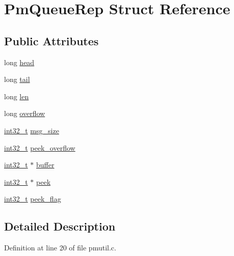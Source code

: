 \hypertarget{struct_pm_queue_rep}{}\section{Pm\+Queue\+Rep Struct Reference}
\label{struct_pm_queue_rep}
\subsection*{Public Attributes}
\begin{DoxyCompactItemize}
\item 
long \hyperlink{struct_pm_queue_rep_ab516ccc6cedbf2ab076e63ad122c10a5}{head}
\item 
long \hyperlink{struct_pm_queue_rep_a86aa2ed3eb0f43260058824bd92c5993}{tail}
\item 
long \hyperlink{struct_pm_queue_rep_a6e3749a77433a84bb26f7d89521adc5c}{len}
\item 
long \hyperlink{struct_pm_queue_rep_a5fcbe9d90e738fb69b03ba7f2b847581}{overflow}
\item 
\hyperlink{lib-src_2ffmpeg_2win32_2stdint_8h_a37994e3b11c72957c6f454c6ec96d43d}{int32\+\_\+t} \hyperlink{struct_pm_queue_rep_a87c1527e7fa395a0aae18efe6f9cd79a}{msg\+\_\+size}
\item 
\hyperlink{lib-src_2ffmpeg_2win32_2stdint_8h_a37994e3b11c72957c6f454c6ec96d43d}{int32\+\_\+t} \hyperlink{struct_pm_queue_rep_ab5aa2fd81ec89f4674a87485398ab0dd}{peek\+\_\+overflow}
\item 
\hyperlink{lib-src_2ffmpeg_2win32_2stdint_8h_a37994e3b11c72957c6f454c6ec96d43d}{int32\+\_\+t} $\ast$ \hyperlink{struct_pm_queue_rep_a808f75fb14f8aef3ceadc691bbd0986b}{buffer}
\item 
\hyperlink{lib-src_2ffmpeg_2win32_2stdint_8h_a37994e3b11c72957c6f454c6ec96d43d}{int32\+\_\+t} $\ast$ \hyperlink{struct_pm_queue_rep_a0b498ff007aae21d7d6651722cc781c3}{peek}
\item 
\hyperlink{lib-src_2ffmpeg_2win32_2stdint_8h_a37994e3b11c72957c6f454c6ec96d43d}{int32\+\_\+t} \hyperlink{struct_pm_queue_rep_ad8f20dd6f8f014da9c6ff04ae0ba537f}{peek\+\_\+flag}
\end{DoxyCompactItemize}


\subsection{Detailed Description}


Definition at line 20 of file pmutil.\+c.



